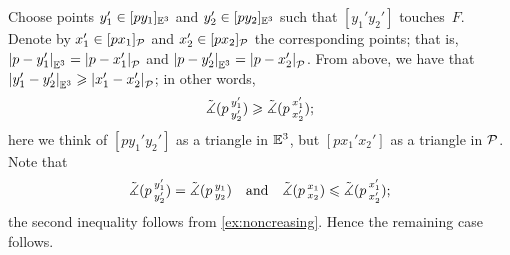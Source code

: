 Choose points $y_1'\in [py_1]_{\mathbb{E}^3}$ and $y_2'\in [py_2]_{\mathbb{E}^3}$ such that $[y_1'y_2']$ touches~$F$.
Denote by $x_1'\in [px_1]_{\mathcal{P}}$ and $x_2'\in [px_2]_{\mathcal{P}}$ the corresponding points;
that is, $|{p}-{y_1'}|_{\mathbb{E}^3}^{{}}=|{p}-{x_1'}|_{\mathcal{P}}^{{}}$ and $|{p}-{y_2'}|_{\mathbb{E}^3}^{{}}=|{p}-{x_2'}|_{\mathcal{P}}^{{}}$.
From  above, we have that $|{y_1'}-{y_2'}|_{\mathbb{E}^3}^{{}}\geqslant|{x_1'}-{x_2'}|_{\mathcal{P}}^{{}}$;
in other words, 
\[\tilde\measuredangle(p\,{}^{y_1'}_{y_2'})\geqslant \tilde\measuredangle(p\,{}^{x_1'}_{x_2'});\]
here we think of  $[p{y_1'}{y_2'}]$ as a triangle in $\mathbb{E}^3$, but $[p{x_1'}{x_2'}]$ as a triangle in $\mathcal{P}$.
Note that 
\[\tilde\measuredangle(p\,{}^{y_1'}_{y_2'})=\tilde\measuredangle(p\,{}^{y_1}_{y_2})
\quad\text{and}\quad
\tilde\measuredangle(p\,{}^{x_1}_{x_2})\leqslant \tilde\measuredangle(p\,{}^{x_1'}_{x_2'});
\]
the second inequality follows from \ref{ex:noncreasing}.
Hence the remaining case follows.
